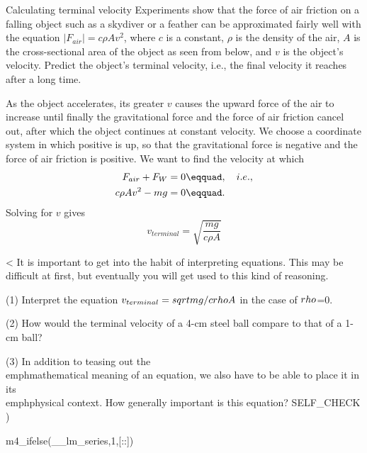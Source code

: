 \begin{eg}{Calculating terminal velocity}
\egquestion Experiments show that the force of air friction on
a falling object such as a skydiver or a feather can be
approximated fairly well with the equation 
$|F_{air}|=c\rho Av^2$, where $c$ is a constant, $\rho$ is the density of the
air, $A$ is the cross-sectional area of the object as seen
from below, and $v$ is the object's velocity. Predict the
object's terminal velocity, i.e., the final velocity it
reaches after a long time.

\eganswer As the object accelerates, its greater $v$ causes
the upward force of the air to increase until finally the
gravitational force and the force of air friction cancel
out, after which the object continues at constant velocity.
We choose a coordinate system in which positive is up, so
that the gravitational force is negative and the force of
air friction is positive. We want to find the velocity at which
\begin{align*}
        F_{air}+ F_W     &=     0\eqquad, \quad i.e.,  \\
        c\rho Av ^2- mg     &=     0\eqquad.
\end{align*}
Solving for $v$ gives
\begin{equation*}
        v_{terminal}  = \sqrt{\frac{mg}{c\rho A}}
\end{equation*}
\end{eg}

<%
It is important to get into the habit of interpreting
equations. This may be difficult at first,
but eventually you will get used to this kind of reasoning.

(1) Interpret the equation $v_{terminal}=\\sqrt{mg/c\\rho A}$ in the case of $\\rho $=0.

(2) How would the terminal velocity of a 4-cm steel ball
compare to that of a 1-cm ball?

(3) In addition to teasing out the \\emph{mathematical} meaning of
an equation, we also have to be able to place it in its \\emph{physical}
context. How generally important is this equation?
  SELF_CHECK
  ) %

m4_ifelse(__lm_series,1,[:\pagebreak[4]:])


